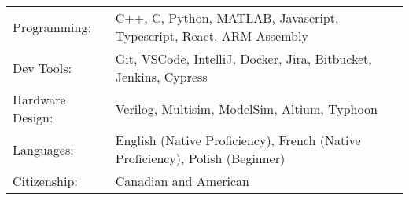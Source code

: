 \begin{tabularx}{\linewidth}{@{}l X@{}}
Programming: &  \normalsize{C++, C, Python, MATLAB, Javascript, Typescript, React, ARM Assembly}\\
Dev Tools:  &  \normalsize{Git, VSCode, IntelliJ, Docker, Jira, Bitbucket, Jenkins, Cypress}\\
Hardware Design: & \normalsize{Verilog, Multisim, ModelSim, Altium, Typhoon} \\
Languages:  &  \normalsize{English (Native Proficiency), French (Native Proficiency), Polish (Beginner)}\\ 
Citizenship: &  \normalsize{Canadian and American}\\
\end{tabularx}
